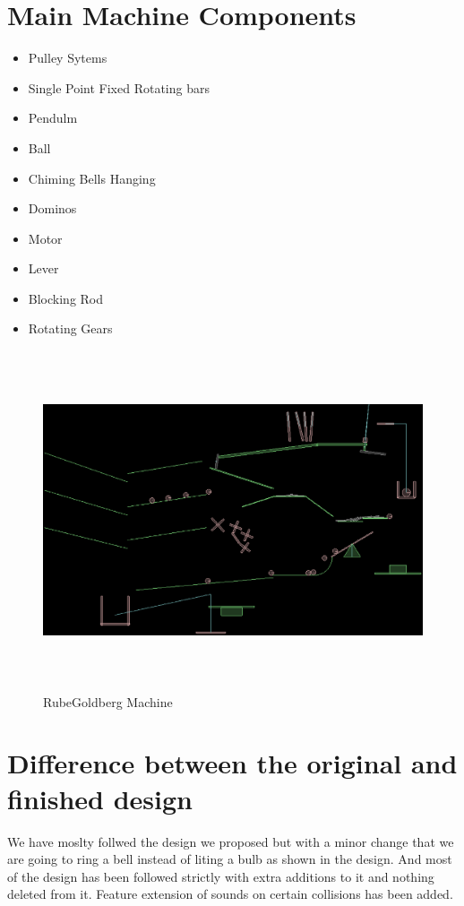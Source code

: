 \documentclass[a4paper,11pt]{article}
\begin{document}
\section{Main Machine Components}
	\begin{itemize}
		\item Pulley Sytems
		\item Single Point Fixed Rotating bars
		\item Pendulm
		\item Ball
		\item Chiming Bells Hanging
		\item Dominos
		\item Motor
		\item Lever
		\item Blocking Rod
		\item Rotating Gears
	\end{itemize}
 	\begin{figure}[ht]
	\includegraphics[height=100mm]{machine.eps}
	\caption{RubeGoldberg Machine}	
	\label{fig:ResourceIntensivePlot01}
	\end{figure}


\section{Difference between the original and finished design}
We have moslty follwed the design we proposed but with a minor change that we are going to ring a bell instead of liting a bulb as shown in the design. And most of the design has been followed strictly with extra additions to it and nothing deleted from it. Feature extension of sounds on certain collisions has been added.
\end{document}
